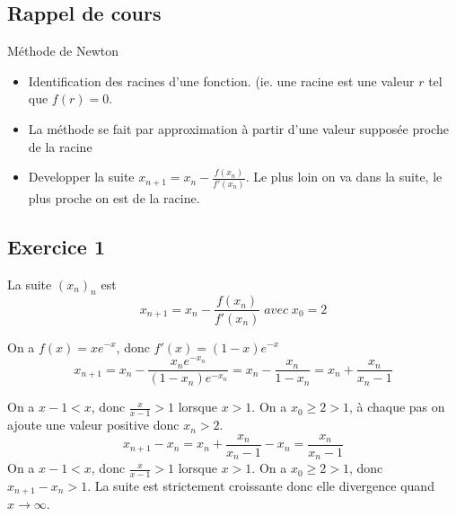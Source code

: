 \documentclass[]{book}
\theoremstyle{definition}
\begin{document}
\subsection*{Rappel de cours}

M\'ethode de Newton

\begin{itemize}
\item Identification des racines d'une fonction. (ie. une racine est une valeur $r$ tel que $f(r)=0$.
\item La m\'ethode se fait par approximation \`a partir d'une valeur suppos\'ee proche de la racine
\item Developper la suite $x_{n+1} = x_n - \frac{f(x_n)}{f'(x_n)}$. Le plus loin on va dans la suite, le plus proche on est de la racine.
\end{itemize}


\subsection*{Exercice 1}

La suite $(x_n)_n$ est 
$$x_{n+1} = x_n - \frac{f(x_n)}{f'(x_n)}\; avec\; x_0 = 2$$

On a $f(x) = xe^{-x}$, donc $f'(x) = (1-x)e^{-x}$
$$x_{n+1} = x_n - \frac{x_ne^{-x_n}}{(1-x_n)e^{-x_n}} = x_n - \frac{x_n}{1-x_n} = x_n + \frac{x_n}{x_n-1}$$

On a $x-1 < x$, donc $\frac{x}{x-1} > 1$ lorsque $x > 1$. On a $x_0 \geq 2 > 1$, \`a chaque pas on ajoute une valeur positive donc $x_n>2$.\\

$$x_{n+1} - x_{n} = x_n + \frac{x_n}{x_n-1} - x_n = \frac{x_n}{x_n-1}$$
On a $x-1 < x$, donc $\frac{x}{x-1} > 1$ lorsque $x > 1$. On a $x_0 \geq 2 > 1$, donc $x_{n+1} - x_{n} > 1$. La suite est strictement croissante donc elle divergence quand $x \to \infty$.
\end{document}
